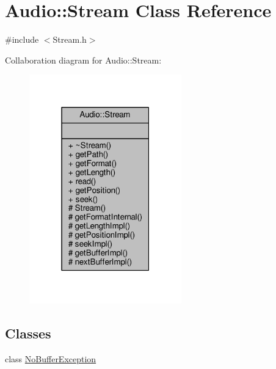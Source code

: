 \hypertarget{classAudio_1_1Stream}{}\section{Audio\+:\+:Stream Class Reference}
\label{classAudio_1_1Stream}


{\ttfamily \#include $<$Stream.\+h$>$}



Collaboration diagram for Audio\+:\+:Stream\+:
\nopagebreak
\begin{figure}[H]
\begin{center}
\leavevmode
\includegraphics[width=187pt]{de/d5f/classAudio_1_1Stream__coll__graph}
\end{center}
\end{figure}
\subsection*{Classes}
\begin{DoxyCompactItemize}
\item 
class \hyperlink{classAudio_1_1Stream_1_1NoBufferException}{No\+Buffer\+Exception}
\end{DoxyCompactItemize}

